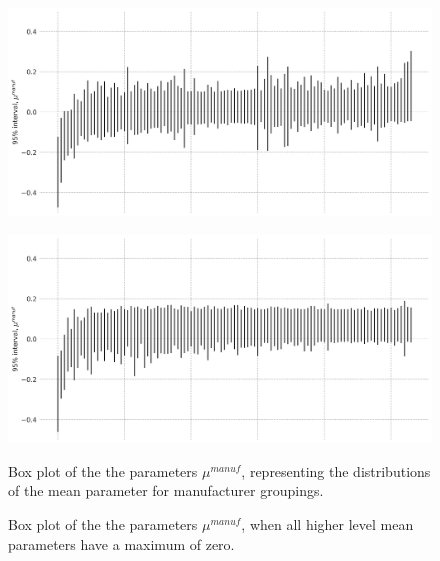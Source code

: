 \documentclass[a4paper]{article}
\begin{document}
\begin{figure}
\begin{minipage}{.45\textwidth}
  \centering
  \includegraphics[width=1\linewidth]{figures/BayManPlot.png}
  \label{fig:BayManPlot}
 \end{minipage}\qquad
\begin{minipage}{.45\textwidth}
  \centering
  \includegraphics[width=1\linewidth]{figures/BayManPlot_const.png}
  \label{fig:BayManPlot_const}
 \end{minipage}

\bigskip

\begin{minipage}[t]{.45\textwidth}
\centering
  \caption{Box plot of the the parameters $\mu^{manuf}$, representing the distributions of the mean parameter for manufacturer groupings.}
\end{minipage}\qquad
\begin{minipage}[t]{.45\textwidth}
\centering
  \caption{Box plot of the the parameters $\mu^{manuf}$, when all higher level mean parameters have a maximum of zero.}
\end{minipage}
\end{figure}


\end{document}
